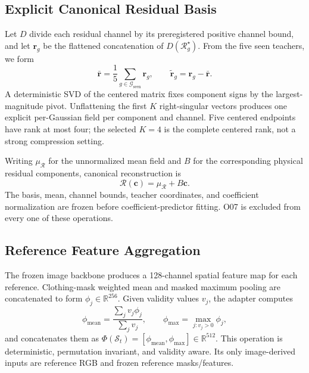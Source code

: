 \subsection{Explicit Canonical Residual Basis}

Let $D$ divide each residual channel by its preregistered positive channel bound, and let $\mathbf r_g$ be the flattened concatenation of $D(\mathcal{R}_g^{\star})$. From the five seen teachers, we form
\begin{equation}
\bar{\mathbf r}=\frac{1}{5}\sum_{g\in\mathcal{G}_{\mathrm{seen}}}\mathbf r_g,
\qquad
\widetilde{\mathbf r}_g=\mathbf r_g-\bar{\mathbf r}.
\end{equation}
A deterministic SVD of the centered matrix fixes component signs by the largest-magnitude pivot. Unflattening the first $K$ right-singular vectors produces one explicit per-Gaussian field per component and channel. Five centered endpoints have rank at most four; the selected $K=4$ is the complete centered rank, not a strong compression setting.

Writing $\mu_{\mathcal R}$ for the unnormalized mean field and $B$ for the corresponding physical residual components, canonical reconstruction is
\begin{equation}
\boxed{\mathcal{R}(\mathbf c)=\mu_{\mathcal R}+B\mathbf c.}
\end{equation}
The basis, mean, channel bounds, teacher coordinates, and coefficient normalization are frozen before coefficient-predictor fitting. O07 is excluded from every one of these operations.

\subsection{Reference Feature Aggregation}

The frozen image backbone produces a 128-channel spatial feature map for each reference. Clothing-mask weighted mean and masked maximum pooling are concatenated to form $\phi_j\in\mathbb{R}^{256}$. Given validity values $v_j$, the adapter computes
\begin{equation}
\phi_{\mathrm{mean}}=\frac{\sum_j v_j\phi_j}{\sum_j v_j},
\qquad
\phi_{\mathrm{max}}=\max_{j:v_j>0}\phi_j,
\end{equation}
and concatenates them as $\Phi(\mathcal{S}_t)=[\phi_{\mathrm{mean}},\phi_{\mathrm{max}}]\in\mathbb{R}^{512}$. This operation is deterministic, permutation invariant, and validity aware. Its only image-derived inputs are reference RGB and frozen reference masks/features.

